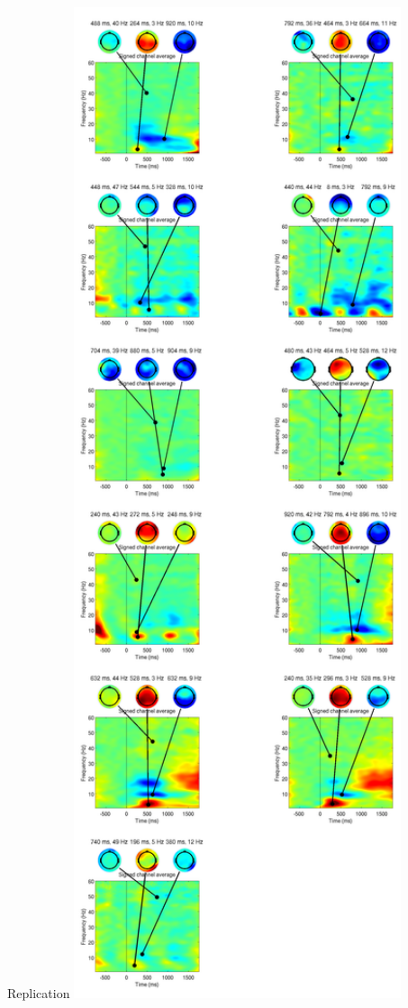 \documentclass[final]{beamer}
\begin{document}
\begin{frame}{}
\begin{textblock}{57}
\begin{block}{Replication}
\includegraphics[height=73cm]{gamma}
\end{block}
\end{textblock}



\end{frame}
\end{document}

